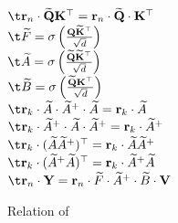 \documentclass[letterpaper,twocolumn,10pt]{article}
\begin{document}
\begin{figure}[t!]
{{        $\t \rand_n \cdot \widetilde{\Q}\K^\top = \rand_n \cdot \widetilde{\Q} \cdot \K^\top$ \\
        $\t \widetilde{F} = \sigma\left( \frac{\Q\widetilde{\K}^\top}{\sqrt{d}} \right)$ \\
        $\t \widetilde{A} = \sigma\left( \frac{\widetilde{\Q}\widetilde{\K}^\top}{\sqrt{d}} \right)$ \\
        $\t \widetilde{B} = \sigma\left( \frac{\widetilde{\Q}\K^\top}{\sqrt{d}} \right)$ \\
        $\t \rand_k \cdot \widetilde{A} \cdot \widetilde{A}^+ \cdot \widetilde{A} = \rand_k \cdot \widetilde{A}$ \\
        $\t \rand_k \cdot \widetilde{A}^+ \cdot \widetilde{A} \cdot \widetilde{A}^+ = \rand_k \cdot \widetilde{A}^+$ \\
        $\t \rand_k \cdot (\widetilde{A}\widetilde{A}^+)^\top = \rand_k \cdot \widetilde{A}\widetilde{A}^+$ \\
        $\t \rand_k \cdot (\widetilde{A}^+\widetilde{A})^\top = \rand_k \cdot \widetilde{A}^+\widetilde{A}$ \\
        $\t \rand_n \cdot \Y = \rand_n \cdot \widetilde{F} \cdot \widetilde{A}^+ \cdot \widetilde{B} \cdot \V$ 
}}
\caption{Relation of \name}
\label{fig:relation}
\end{figure}





\end{document}
